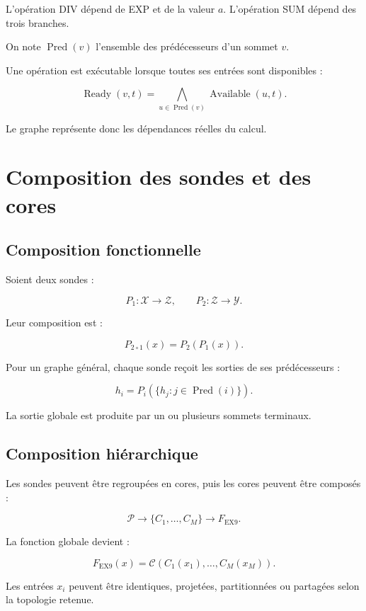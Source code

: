 \documentclass[11pt,a4paper]{article}
\begin{document}
L'opération DIV dépend de EXP et de la valeur $a$.
L'opération SUM dépend des trois branches.

On note $\operatorname{Pred}(v)$ l'ensemble des prédécesseurs
d'un sommet $v$.

Une opération est exécutable lorsque toutes ses entrées sont
disponibles :

\[
\operatorname{Ready}(v,t)
=
\bigwedge_{u\in\operatorname{Pred}(v)}
\operatorname{Available}(u,t).
\]

Le graphe représente donc les dépendances réelles du calcul.

\section{Composition des sondes et des cores}

\subsection{Composition fonctionnelle}

Soient deux sondes :

\[
P_1:\mathcal{X}\rightarrow\mathcal{Z},
\qquad
P_2:\mathcal{Z}\rightarrow\mathcal{Y}.
\]

Leur composition est :

\[
P_{2\circ1}(x)=P_2(P_1(x)).
\]

Pour un graphe général, chaque sonde reçoit les sorties de ses
prédécesseurs :

\[
h_i
=
P_i
\left(
\{h_j:j\in\operatorname{Pred}(i)\}
\right).
\]

La sortie globale est produite par un ou plusieurs sommets terminaux.

\subsection{Composition hiérarchique}

Les sondes peuvent être regroupées en cores, puis les cores
peuvent être composés :

\[
\mathcal{P}
\longrightarrow
\{C_1,\ldots,C_M\}
\longrightarrow
F_{\mathrm{EX9}}.
\]

La fonction globale devient :

\[
F_{\mathrm{EX9}}(x)
=
\mathcal{C}
\left(
C_1(x_1),\ldots,C_M(x_M)
\right).
\]

Les entrées $x_i$ peuvent être identiques, projetées, partitionnées
ou partagées selon la topologie retenue.
\end{document}
